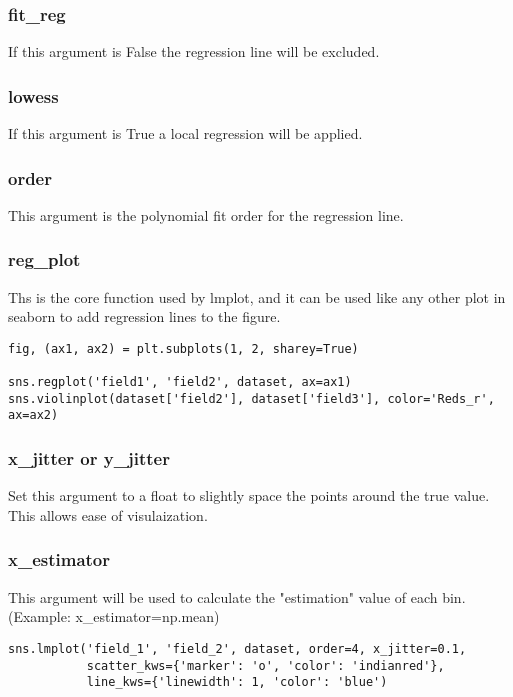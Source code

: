 %
\subsubsection{fit\_reg}
If this argument is False the regression line will be excluded.

%
\subsubsection{lowess}
If this argument is True a local regression will be applied.

%
\subsubsection{order}
This argument is the polynomial fit order for the regression line.

%
\subsubsection{reg\_plot}
Ths is the core function used by lmplot, and it can be used like any other
plot in seaborn to add regression lines to the figure.

\begin{lstlisting}
fig, (ax1, ax2) = plt.subplots(1, 2, sharey=True)

sns.regplot('field1', 'field2', dataset, ax=ax1)
sns.violinplot(dataset['field2'], dataset['field3'], color='Reds_r', ax=ax2)
\end{lstlisting}
%
\subsubsection{x\_jitter or y\_jitter}
Set this argument to a float to slightly space the points around the true value.
This allows ease of visulaization.

%
\subsubsection{x\_estimator}
This argument will be used to calculate the "estimation" value of each bin.
(Example: x\_estimator=np.mean)


\begin{lstlisting}
sns.lmplot('field_1', 'field_2', dataset, order=4, x_jitter=0.1,
           scatter_kws={'marker': 'o', 'color': 'indianred'},
           line_kws={'linewidth': 1, 'color': 'blue')
\end{lstlisting}

